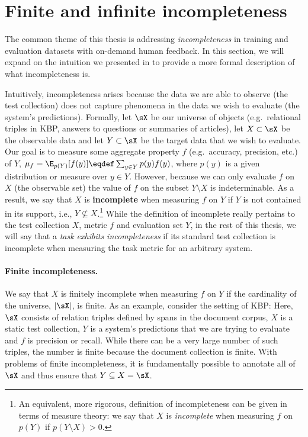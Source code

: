\section{\label{sec:setup:incompleteness} Finite and infinite incompleteness}

The common theme of this thesis is addressing \textit{incompleteness} in training and evaluation datasets with on-demand human feedback. 
In this section, we will expand on the intuition we presented in  to provide a more formal description of what incompleteness is.

Intuitively, incompleteness arises because the data we are able to observe (the test collection)  does not capture phenomena in the data we wish to evaluate (the system's predictions).
Formally,
  let $\sX$ be our universe of objects (e.g.\ relational triples in KBP, answers to questions or summaries of articles),
  let $X \subset \sX$ be the observable data
  and let $Y \subset \sX$ be the target data that we wish to evaluate.
Our goal is to measure some aggregate property $f$ (e.g.\
accuracy, precision, etc.) of $Y$, $\mu_f = \E_{p(Y)}[f(y)] \eqdef \sum_{y \in Y} p(y) f(y)$, where $p(y)$ is a given distribution or measure over $y \in Y$.
However, because we can only evaluate $f$ on $X$ (the observable set) the value of $f$ on the subset $Y \setminus X$ is indeterminable.
As a result, we say that $X$ is \textbf{incomplete} when measuring $f$ on $Y$ if $Y$ is not contained in its support, i.e., $Y \not\subseteq X$.\footnote{%
An equivalent, more rigorous, definition of incompleteness can be given in terms of measure theory: we say that $X$ is \textit{incomplete} when measuring $f$ on $p(Y)$ if $p(Y \setminus X) > 0$.
}
While the definition of incomplete really pertains to the test collection $X$, metric $f$ and evaluation set $Y$, in the rest of this thesis, we will say that a \textit{task exhibits incompleteness} if its standard test collection is incomplete when measuring the task metric for an arbitrary system.

\paragraph{Finite incompleteness.}
We say that $X$ is finitely incomplete when measuring $f$ on $Y$ if the cardinality of the universe, $|\sX|$, is finite.
As an example, consider the setting of KBP:\@
Here, $\sX$ consists of relation triples defined by spans in the document corpus, $X$ is a static test collection, $Y$ is a system's predictions that we are trying to evaluate and $f$ is precision or recall.
While there can be a very large number of such triples, the number is finite because the document collection is finite.
With problems of finite incompleteness, it is fundamentally possible to annotate all of $\sX$ and thus ensure that $Y \subseteq X = \sX$.

